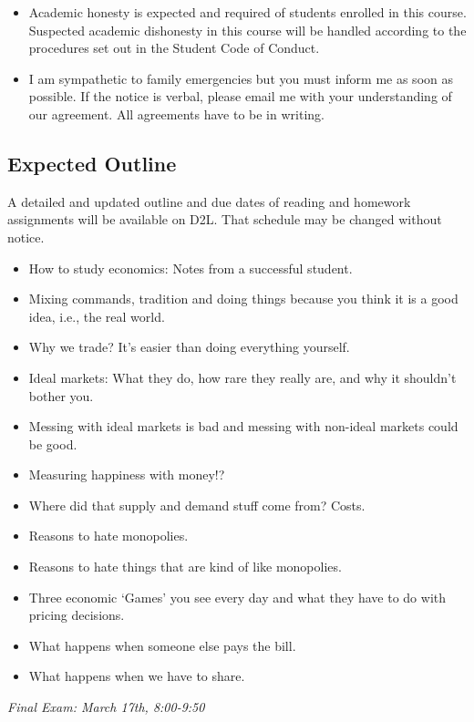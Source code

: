 \documentclass[letterpaper,10pt]{article}
\newcommand{\ExamOne}{Final Exam:  March 17th, 8:00-9:50}
\begin{document}
\begin{itemize}
\item Academic honesty is expected and required of students enrolled
  in this course.  Suspected academic dishonesty in this course will
  be handled according to the procedures set out in the Student Code
  of Conduct.

\item I am sympathetic to family emergencies but you must inform me as
  soon as possible. If the notice is verbal, please email me with your
  understanding of our agreement. All agreements have to be in
  writing.

\end{itemize}

 
\subsection{Expected Outline}
A detailed and updated outline and due dates of reading and homework assignments will be available on D2L.  That schedule may be changed without notice.

\begin{itemize}
\item How to study economics: Notes from a successful student.
\item Mixing commands, tradition and doing things because you think it
  is a good idea, i.e., the real world. 
\item Why we trade?  It's easier than doing everything yourself.
\item Ideal markets: What they do, how rare they really are, and why
  it shouldn't bother you.
\item Messing with ideal markets is bad and messing with non-ideal
  markets could be good.
\item Measuring happiness with money!?
\item Where did that supply and demand stuff come from?  Costs.
\item Reasons to hate monopolies.
\item Reasons to hate things that are kind of like monopolies.
\item Three economic `Games' you see every day and what they have to
  do with pricing decisions.
\item What happens when someone else pays the bill.
\item What happens when we have to share.
\end{itemize}

\medskip

\centering

\emph{\ExamOne}
\end{document}
